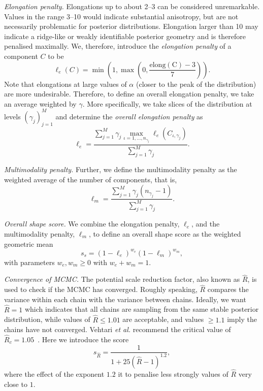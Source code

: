 \documentclass[11pt]{report}
\begin{document}
\textit{Elongation penalty.}
Elongations up to about 2--3 can be considered unremarkable. 
Values in the range 3--10 would indicate substantial anisotropy,
but are not necessarily problematic for posterior distributions. 
Elongation larger than 10 may indicate a ridge-like or weakly 
identifiable posterior geometry and is therefore penalised maximally.
We, therefore, introduce the \textit{elongation penalty} of a 
component $C$ to be 
\begin{equation}
    \ell_e(C) = \min\left(1, \max\left(0, \frac{\operatorname{elong(C)}-3}{7}\right)\right).
\end{equation}
Note that elongations at large values of $\alpha$ (closer to the 
peak of the distribution) are more undesirable. Therefore,
to define an overall elongation penalty, we take 
an average weighted by $\gamma$. More specifically,
we take slices of the distribution at levels $(\gamma_j)_{j=1}^{M}$
and determine the \textit{overall elongation penalty} as 
\begin{equation}
    \ell_e = 
        \dfrac{         
            \sum_{j=1}^{M} \gamma_j \max_{\iota=1,\ldots, n_{\gamma_j}} \ell_e(C_{\iota, \gamma_j})}
        {
            \sum_{j=1}^{M} \gamma_j
        }.
\end{equation}

\textit{Multimodality penalty.}
Further, we define the multimodality penalty as 
the weighted average of the number of components, 
that is,
\begin{equation}
    \ell_m = \frac{
        \sum_{j=1}^{M} \gamma_j (n_{\gamma_j} - 1)
    }{
        \sum_{j=1}^{M} \gamma_j 
    }.
\end{equation}


\textit{Overall shape score.}
We combine the elongation penalty, $\ell_e$, and the 
multimodality penalty, $\ell_m$, to define an 
overall shape score as the weighted geometric mean 
\begin{equation}
    s_s = (1-\ell_e)^{w_e}(1-\ell_m)^{w_m},
\end{equation}
with parameters $w_e, w_m \geq 0$ with $w_e + w_m = 1$.


\textit{Convergence of MCMC.} The potential scale reduction factor,
also known as $\widehat{R}$, is used to check if the MCMC has converged.
Roughly speaking, $\widehat{R}$ compares the variance within each chain 
with the variance between chains. Ideally, we want $\widehat{R} = 1$ 
which indicates that all chains are sampling from the same 
stable posterior distribution, while 
values of $\widehat{R} \leq 1.01$ are acceptable, and 
values $\geq 1.1$ imply the chains have not converged. 
Vehtari \textit{et al.} recommend the critical value of 
$\widehat{R}_c = 1.05$~\cite{Vehtari2021}.
Here we introduce the score
\begin{equation}
    s_{\widehat{R}} = \frac{1}{1 + 25 (\widehat{R}-1)^{1.2}},
\end{equation}
where the effect of the exponent $1.2$ it to penalise 
less strongly values of $\widehat{R}$ very close to $1$.
\end{document}
